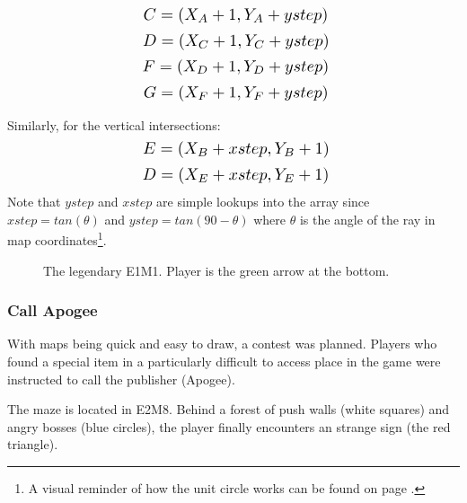 \begin{equation*}
    \scalebox{1.3}{
$C = (X_{A} +1, Y_{A} + ystep)$\\
}
\end{equation*}
\begin{equation*}
    \scalebox{1.3}{
$D = (X_{C} +1, Y_{C} + ystep)$\\
}
\end{equation*}
\begin{equation*}
    \scalebox{1.3}{
$F = (X_{D} +1, Y_{D} + ystep)$\\
}
\end{equation*}
\begin{equation*}
    \scalebox{1.3}{
$G = (X_{F} +1, Y_{F} + ystep)$\\
}
\end{equation*}


\par
Similarly, for the vertical intersections:\\
  \begin{equation*}
    \scalebox{1.3}{

$E = (X_{B} + xstep, Y_{B} + 1)$\\
}
\end{equation*}
  \begin{equation*}
    \scalebox{1.3}{
$D = (X_{E} + xstep, Y_{E} + 1)$\\
}
\end{equation*}
Note that $ystep$ and $xstep$ are simple lookups into the  array since $xstep=tan(\theta)$ and $ystep=tan(90-\theta)$ where $\theta$ is the angle of the ray in map coordinates\footnote{A visual reminder of how the unit circle works can be found on page \pageref{unit_circle}.}.\\
\par
\begin{figure}[H]
  \centering
 \label{mape1m1}
 \caption{The legendary E1M1. Player is the green arrow at the bottom.}
\end{figure}


\subsubsection{Call Apogee}
With maps being quick and easy to draw, a contest was planned. Players who found a special item in a particularly difficult to access place in the game were instructed to call the publisher (Apogee).\\
\par The maze is located in E2M8. Behind a forest of push walls (white squares) and angry bosses (blue circles), the player finally encounters an strange sign (the red triangle).


